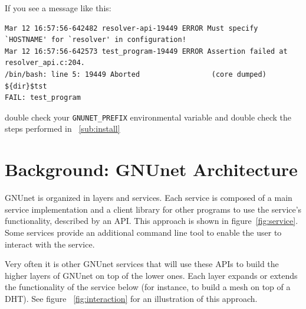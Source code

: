 \documentclass[10pt]{article}
\begin{document}
If you see a message like this:

\begin{lstlisting}
Mar 12 16:57:56-642482 resolver-api-19449 ERROR Must specify `HOSTNAME' for `resolver' in configuration!
Mar 12 16:57:56-642573 test_program-19449 ERROR Assertion failed at resolver_api.c:204.
/bin/bash: line 5: 19449 Aborted                 (core dumped) ${dir}$tst
FAIL: test_program
\end{lstlisting}
double check your {\tt GNUNET\_PREFIX} environmental variable and double check the steps performed in ~\ref{sub:install}

\section{Background: GNUnet Architecture}
GNUnet is organized in layers and services. Each service is composed of a
main service implementation and a client library for other programs to use 
the service's functionality, described by an API. This approach is shown in 
figure~\ref{fig:service}. Some services provide an additional command line 
tool to enable the user to interact with the service.

Very often it is other GNUnet services that will use these APIs to build the
higher layers of GNUnet on top of the lower ones. Each layer expands or extends
the functionality of the service below (for instance, to build a mesh on top of
a DHT). See figure ~\ref{fig:interaction} for an illustration of this approach.
\end{document}
